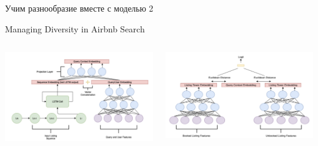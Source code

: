\documentclass[11pt,aspectratio=169,handout]{beamer}
\begin{document}
\begin{frame}{Учим разнообразие вместе с моделью 2}

\begin{center}
Managing Diversity in Airbnb Search \cite{AIRBNB}
\end{center}

\begin{columns}

\begin{column}{0.45\textwidth}
\begin{center}
\includegraphics[scale=0.25]{images/airbnb2.png}
\end{center}
\end{column}

\begin{column}{0.45\textwidth} 
\begin{center}
\includegraphics[scale=0.25]{images/airbnb.png}
\end{center}
\end{column}

\end{columns}

\end{frame}
\end{document}
